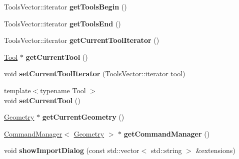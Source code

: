 \begin{DoxyCompactItemize}
Tools\+Vector\+::iterator {\bfseries get\+Tools\+Begin} ()
\item 
\mbox{\label{classpepr3d_1_1_main_application_a71cb88d088358a0121a080f728126eef}} 
Tools\+Vector\+::iterator {\bfseries get\+Tools\+End} ()
\item 
\mbox{\label{classpepr3d_1_1_main_application_a8d69a67e452592afc6e7e2f6b7e6b9a0}} 
Tools\+Vector\+::iterator {\bfseries get\+Current\+Tool\+Iterator} ()
\item 
\mbox{\label{classpepr3d_1_1_main_application_a69aa1c6492d7ec045dcbcdb25b8d9912}} 
\mbox{\hyperlink{classpepr3d_1_1_tool}{Tool}} $\ast$ {\bfseries get\+Current\+Tool} ()
\item 
\mbox{\label{classpepr3d_1_1_main_application_ac5ea5ce0d25e8ff5c996eb33956ab9a8}} 
void {\bfseries set\+Current\+Tool\+Iterator} (Tools\+Vector\+::iterator tool)
\item 
\mbox{\label{classpepr3d_1_1_main_application_a429927346ea0766c39f0b713888f80fd}} 
{\footnotesize template$<$typename Tool $>$ }\\void {\bfseries set\+Current\+Tool} ()
\item 
\mbox{\label{classpepr3d_1_1_main_application_ae47b18590297b63e6e0e5ae01fc027d5}} 
\mbox{\hyperlink{classpepr3d_1_1_geometry}{Geometry}} $\ast$ {\bfseries get\+Current\+Geometry} ()
\item 
\mbox{\label{classpepr3d_1_1_main_application_a133b4db1b39af78dc68b5a9181eaabc7}} 
\mbox{\hyperlink{classpepr3d_1_1_command_manager}{Command\+Manager}}$<$ \mbox{\hyperlink{classpepr3d_1_1_geometry}{Geometry}} $>$ $\ast$ {\bfseries get\+Command\+Manager} ()
\item 
\mbox{\label{classpepr3d_1_1_main_application_a7940de51f976d83f840e956be02481b3}} 
void {\bfseries show\+Import\+Dialog} (const std\+::vector$<$ std\+::string $>$ \&extensions)
\item 
\mbox{\label{classpepr3d_1_1_main_application_a01f443ad1cc7da13fc0769a79dd56c50}} 

\end{DoxyCompactItemize}
